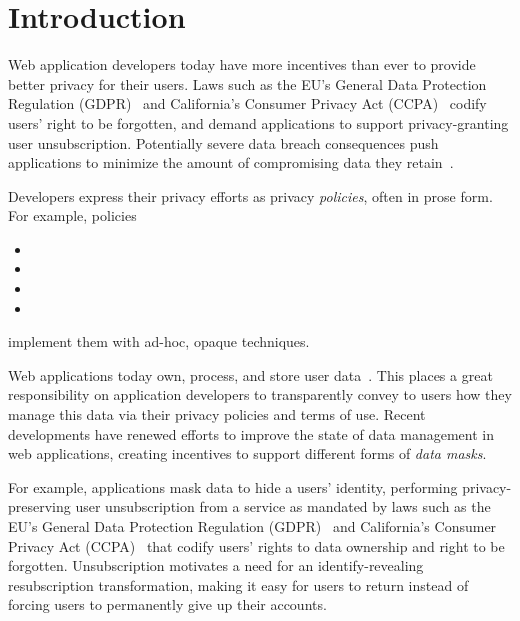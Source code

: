 \section{Introduction}
Web application developers today have more incentives than ever to provide better privacy for their
users.
%
Laws such as the EU's General Data Protection Regulation (GDPR)~\cite{eu:gdpr} and California's
Consumer Privacy Act (CCPA)~\cite{ca:privacy-act} codify users' right to be forgotten, and demand
applications to support privacy-granting user unsubscription.
%
Potentially severe data breach consequences push applications to minimize the amount of
compromising data they retain~\cite{breach:amazon,breach:twitter, breach:fb, breach:marriott,
breach:quora}.

Developers express their privacy efforts as privacy \emph{policies}, often in prose form. For
example, policies
\begin{itemize}
    \item 
    \item 
    \item 
    \item 
\end{itemize}

implement them with ad-hoc, opaque techniques.

\iffalse
Web applications today own, process, and store user data~\cite{nytimes:fb, npr:data}. This places a
great responsibility on application developers to transparently convey to users how they manage this
data via their privacy policies and terms of use.
%
Recent developments have renewed efforts to improve the state of data management in web
applications, creating incentives to support different forms of \emph{data masks}.

For example, applications mask data to hide a users' identity, performing privacy-preserving user
unsubscription from a service as mandated by laws such as the EU's General Data Protection
Regulation (GDPR)~\cite{eu:gdpr} and California's Consumer Privacy Act (CCPA)~\cite{ca:privacy-act}
that codify users' rights to data ownership and right to be forgotten. Unsubscription motivates a
need for an identify-revealing resubscription transformation, making it easy for users to return
instead of forcing users to permanently give up their accounts.

